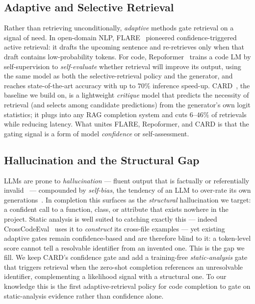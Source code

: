 \documentclass[10pt,conference]{IEEEtran}
\begin{document}
\subsection{Adaptive and Selective Retrieval}
Rather than retrieving unconditionally, \emph{adaptive} methods gate retrieval on a
signal of need. In open-domain NLP, FLARE~\cite{jiang2023flare} pioneered
confidence-triggered active retrieval: it drafts the upcoming sentence and
re-retrieves only when that draft contains low-probability tokens. For code,
Repoformer~\cite{wu2024repoformer} trains a code LM by self-supervision to
\emph{self-evaluate} whether retrieval will improve its output, using the same
model as both the selective-retrieval policy and the generator, and reaches
state-of-the-art accuracy with up to $70\%$ inference speed-up. CARD~\cite{zhang2024card},
the baseline we build on, is a lightweight \emph{critique} model that predicts the
necessity of retrieval (and selects among candidate predictions) from the
generator's own logit statistics; it plugs into any RAG completion system and cuts
$6$--$46\%$ of retrievals while reducing latency. What unites FLARE, Repoformer,
and CARD is that the gating signal is a form of model \emph{confidence} or
self-assessment.

\subsection{Hallucination and the Structural Gap}
LLMs are prone to \emph{hallucination} --- fluent output that is factually or
referentially invalid~\cite{jiang2023flare} --- compounded by \emph{self-bias},
the tendency of an LLM to over-rate its own
generations~\cite{xu-etal-2024-pride}. In completion this surfaces as the
\emph{structural} hallucination we target: a confident call to a function, class,
or attribute that exists nowhere in the project. Static analysis is well suited to
catching exactly this --- indeed CrossCodeEval~\cite{ding2023cce} uses it to
\emph{construct} its cross-file examples --- yet existing adaptive gates remain
confidence-based and are therefore blind to it: a token-level score cannot tell a
resolvable identifier from an invented one. This is the gap we fill. We keep
CARD's confidence gate and add a training-free \emph{static-analysis} gate that
triggers retrieval when the zero-shot completion references an unresolvable
identifier, complementing a likelihood signal with a structural one. To our
knowledge this is the first adaptive-retrieval policy for code completion to gate
on static-analysis evidence rather than confidence alone.
\end{document}

